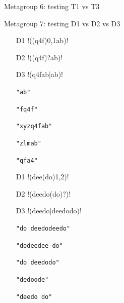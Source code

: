 Metagroup 6: testing T1 vs T3
\vspace{-5mm}
\begin{multicols}{3}
\begin{itemize}[noitemsep,topsep=0pt]
\item[T1] \cverb!(\$\{)\d+(:[^}]+\})!
\item[T3] \cverb!([$][{])\d+(:[^}]+[}])!
\item[] \verb|"${881:}"|
\item[] \verb|"{12:-}"|
\item[] \verb|"${09.1::}"|
\item[] \verb|"${31:13}"|
\item[] \verb|"#${1:x22}"|
\item[T1] \cverb!t\.\$+\d+\*!
\item[T3] \cverb!t[.][$]+\d+[*]!
\item[] \verb|"t..5*"|
\item[] \verb|"ampty.*$0"|
\item[] \verb|"sit."|
\item[] \verb|"t.$111*"|
\item[] \verb|"qt.$$$41*"|
\item[T1] \cverb!\{\$(\d+\.\d)\}!
\item[T3] \cverb![{][$](\d+[.]\d)[}]!
\item[] \verb|"{$88.\}"|
\item[] \verb|"{$0.3}"|
\item[] \verb|"$99.2"|
\item[] \verb|"{$31.13}"|
\item[] \verb|"{$112.4}"|
\end{itemize}
\end{multicols}
Metagroup 7: testing D1 vs D2 vs D3
\vspace{-5mm}
\begin{multicols}{2}
\begin{itemize}[noitemsep,topsep=0pt]
\item[D1] \cverb!((q4f){0,1}ab)!
\item[D2] \cverb!((q4f)?ab)!
\item[D3] \cverb!(q4fab|ab)!
\item[] \verb|"ab"|
\item[] \verb|"fq4f"|
\item[] \verb|"xyzq4fab"|
\item[] \verb|"zlmab"|
\item[] \verb|"qfa4"|
\item[D1] \cverb!(dee(do){1,2})!
\item[D2] \cverb!(deedo(do)?)!
\item[D3] \cverb!(deedo|deedodo)!
\item[] \verb|"do deedodeedo"|
\item[] \verb|"dodeedee do"|
\item[] \verb|"do deedodo"|
\item[] \verb|"dedoode"|
\item[] \verb|"deedo do"|
\end{itemize}
\end{multicols}
